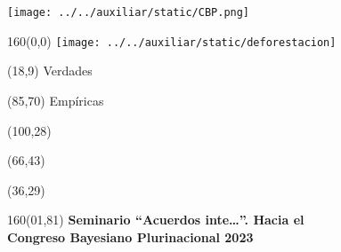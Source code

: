 \documentclass[shownotes,aspectratio=169]{beamer}
\begin{document}
\color{black!85}
\large


\begin{frame}
\centering \vspace{0.5cm}
\texttt{[image: ../../auxiliar/static/CBP.png]}
\end{frame}

\begin{frame}


\begin{textblock}{160}(0,0)
\texttt{[image: ../../auxiliar/static/deforestacion]}
\end{textblock}

\begin{textblock}{80}(18,9)
\textcolor{black!15}{\fontsize{44}{55}\selectfont Verdades}
\end{textblock}

\begin{textblock}{47}(85,70)
\centering \textcolor{black!15}{{\fontsize{52}{65}\selectfont Empíricas}}
\end{textblock}

\begin{textblock}{80}(100,28)
\LARGE  \textcolor{black!15}{}
\end{textblock}

\begin{textblock}{80}(66,43)
\LARGE  \textcolor{black!15}{\scalebox{6}{$=$}}
\end{textblock}

\begin{textblock}{80}(36,29)
\LARGE  \textcolor{black!15}{\scalebox{9}{$p$}}
\end{textblock}



\begin{textblock}{160}(01,81)
\footnotesize \textcolor{black!5}{\textbf{Seminario ``Acuerdos inte\dots''. Hacia el \\
Congreso Bayesiano Plurinacional 2023} \\}
\end{textblock}

\end{frame}
\end{document}
